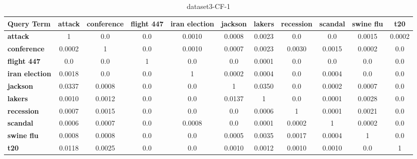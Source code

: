 \documentclass{sig-alternate}
\begin{document}
\begin{table}[!ht]
\centering
\resizebox{14cm}{!} 
{
	\begin{tabular}{|l|c|c|c|c|c|c|c|c|c|c|}
	\hline
\textbf{	Query Term} & \textbf{attack} & \textbf{conference} & \textbf{flight 447 }& \textbf{iran election} & \textbf{jackson} & \textbf{lakers} & \textbf{recession} &\textbf{ scandal} & \textbf{swine flu} & \textbf{t20}\\
	\hline
\textbf{	attack} & 1 & 0.0 & 0.0 & 0.0010 & 0.0008 & 0.0023 & 0.0 & 0.0 & 0.0015 & 0.0002\\
	\hline	
\textbf{conference } & 0.0002 & 1 & 0.0 & 0.0010 & 0.0007 & 0.0023 & 0.0030 & 0.0015 & 0.0002 & 0.0\\
	 	\hline
\textbf{flight 447 }& 0.0 & 0.0 & 1 & 0.0  & 0.0 & 0.0001 & 0.0 & 0.0 & 0.0 & 0.0\\
	  	\hline
\textbf{iran election}	& 0.0018	 & 0.0 & 0.0 & 1 & 0.0002 & 0.0004 & 0.0 & 0.0004 & 0.0 & 0.0 \\
	   	\hline
\textbf{jackson}	  & 0.0337 & 0.0008 & 0.0 & 0.0  & 1 & 0.0350 & 0.0 & 0.0002 & 0.0007 & 0.0\\
	   	\hline
\textbf{lakers	  }& 0.0010 & 0.0012 & 0.0 & 0.0 & 0.0137 & 1 & 0.0 & 0.0001 & 0.0028 & 0.0\\
	    	\hline
\textbf{recession  }& 0.0007 & 0.0015 & 0.0 & 0.0 & 0.0 & 0.0006 & 1 & 0.0001 & 0.0021 & 0.0\\
	     	\hline
\textbf{scandal }& 0.0006 & 0.0007 & 0.0 & 0.0008 & 0.0 & 0.0001 & 0.0002 & 1 & 0.0002 & 0.0\\
	      	\hline
\textbf{swine flu }& 0.0008 & 0.0008 & 0.0 & 0.0 & 0.0005 & 0.0035 & 0.0017 & 0.0004 & 1 & 0.0\\
	       \hline
\textbf{t20 }& 0.0118 & 0.0025 & 0.0 & 0.0 & 0.0010 & 0.0012 & 0.0010 & 0.0010 & 0.0 & 1\\
	\hline
	\end{tabular}
}
\caption{dataset3-CF-1}\label{cf2}
\end{table}
\end{document}
